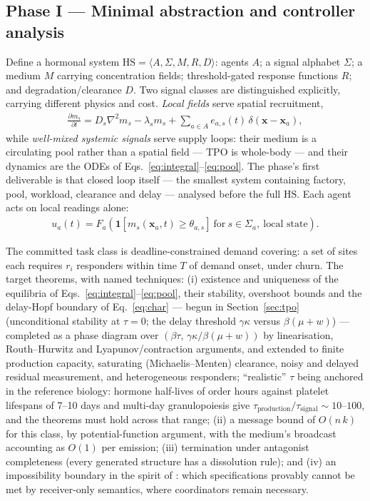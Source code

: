 \documentclass[twoside,twocolumn,usenatbib]{mnras}
\begin{document}
\subsection{Phase I --- Minimal abstraction and controller analysis}

Define a hormonal system $\mathrm{HS} = \langle A, \Sigma, M, R, D
\rangle$: agents $A$; a signal alphabet $\Sigma$; a medium $M$ carrying
concentration fields; threshold-gated response functions $R$; and
degradation/clearance $D$. Two signal classes are distinguished
explicitly, carrying different physics and cost.
\emph{Local fields} serve spatial recruitment,
\begin{align}
\frac{\partial m_s}{\partial t}
  = D_s \nabla^2 m_s - \lambda_s m_s
    + \sum_{a \in A} e_{a,s}(t)\,\delta(\mathbf{x} - \mathbf{x}_a),
\label{eq:medium}
\end{align}
while \emph{well-mixed systemic signals} serve supply loops: their
medium is a circulating pool rather than a spatial field --- TPO is
whole-body --- and their dynamics are the ODEs of
Eqs.~\ref{eq:integral}--\ref{eq:pool}. The phase's first deliverable
is that closed loop itself --- the smallest system containing factory,
pool, workload, clearance and delay --- analysed before the full
$\mathrm{HS}$. Each agent acts on local readings alone:
\begin{align}
u_a(t) = F_a\!\left(\mathbf{1}[m_{s}(\mathbf{x}_a, t) \ge \theta_{a,s}]
\ \text{for}\ s \in \Sigma_a,\ \text{local state}\right).
\label{eq:response}
\end{align}

The committed task class is deadline-constrained demand covering: a set
of sites each requires $r_i$ responders within time $T$ of demand
onset, under churn. The target theorems, with named techniques: (i)
existence and uniqueness of the equilibria of
Eqs.~\ref{eq:integral}--\ref{eq:pool}, their stability, overshoot
bounds and the delay-Hopf boundary of Eq.~\ref{eq:char} --- begun in
Section~\ref{sec:tpo} (unconditional stability at $\tau = 0$; the
delay threshold $\gamma\kappa$ versus $\beta(\mu+w)$) --- completed as
a phase diagram over $(\beta\tau,\, \gamma\kappa/\beta(\mu+w))$ by
linearisation, Routh--Hurwitz and Lyapunov/contraction arguments, and
extended to finite production capacity, saturating
(Michaelis--Menten) clearance, noisy and delayed residual measurement,
and heterogeneous responders; ``realistic''
$\tau$ being anchored in the reference biology: hormone half-lives of
order hours against platelet lifespans of 7--10 days and multi-day
granulopoiesis give $\tau_{\mathrm{production}}/\tau_{\mathrm{signal}}
\sim 10$--$100$, and the theorems must hold across that range; (ii) a
message bound of
$O(n\,k)$ for this class, by potential-function argument, with the
medium's broadcast accounting as $O(1)$ per emission; (iii) termination under antagonist
completeness (every generated
structure has a dissolution rule); and (iv) an impossibility boundary
in the spirit of \citet{fischer1985}: which specifications provably
cannot be met by receiver-only semantics, where coordinators remain
necessary.
\end{document}
